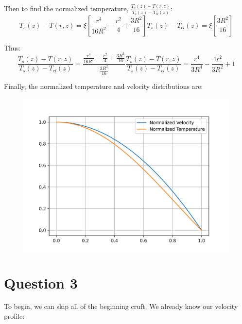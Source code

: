 \documentclass{article}
\begin{document}
Then to find the normalized temperature, $\frac{T_s(z) - T(r,z)}{T_s(z) - T_{cl}(z)}$:
\begin{subequations}
    \begin{equation}
        T_s(z) - T(r,z) = \xi\left[ \frac{r^4}{16R^2} - \frac{r^2}{4} + \frac{3R^2}{16} \right]
    \end{equation}
    \begin{equation}
        T_s(z) - T_{cl}(z) = \xi [\frac{3R^2}{16}]
    \end{equation}
\end{subequations}

Thus:
\begin{subequations}

    \begin{equation}
        \frac{T_s(z) - T(r,z)}{T_s(z) - T_{cl}(z)} = \frac{\frac{r^4}{16R^2} - \frac{r^2}{4} + \frac{3R^2}{16}}{\frac{3R^2}{16}}
    \end{equation}
    \begin{equation}
        \frac{T_s(z) - T(r,z)}{T_s(z) - T_{cl}(z)} = \frac{r^4}{3R^4} - \frac{4r^2}{3R^2} + 1 
    \end{equation}
\end{subequations}

Finally, the normalized temperature and velocity distributions are:
\begin{figure}[!h!]
    \centering
    \includegraphics[width=0.5\linewidth]{plots/q2.png}
    \label{fig:q2}
\end{figure}

\newpage
\section*{Question 3}
To begin, we can skip all of the beginning cruft. We already know our velocity profile:
\end{document}
